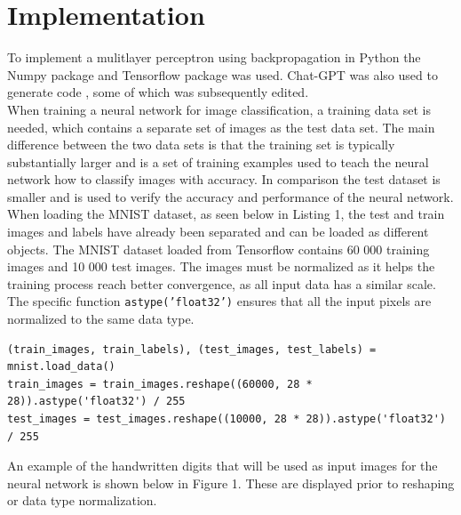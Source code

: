 \documentclass[twocolumn]{article}
\begin{document}
\section{Implementation}
To implement a mulitlayer perceptron using backpropagation in Python \cite{5python} the Numpy \cite{harris2020array} package and Tensorflow \cite{tensorflow2015-whitepaper} package was used. Chat-GPT was also used to generate code \cite{openai_gpt3}, some of which was subsequently edited.
\\\newline
When training a neural network for image classification, a training data set is needed, which contains a separate set of images as the test data set. The main difference between the two data sets is that the training set is typically substantially larger and is a set of training examples used to teach the neural network how to classify images with accuracy. \cite{grosse2} In comparison the test dataset is smaller and is used to verify the accuracy and performance of the neural network. When loading the MNIST dataset, as seen below in Listing 1, the test and train images and labels have already been separated and can be loaded as different objects. The MNIST dataset loaded from Tensorflow \cite{tensorflow2015-whitepaper} contains 60 000 training images and 10 000 test images. The images must be normalized as it helps the training process reach better convergence, as all input data has a similar scale. The specific function \texttt{astype('float32')} ensures that all the input pixels are normalized to the same data type.
\begin{lstlisting}[caption={Importing the MNIST dataset, and parsing the test and training images},captionpos=b]
(train_images, train_labels), (test_images, test_labels) = mnist.load_data()
train_images = train_images.reshape((60000, 28 * 28)).astype('float32') / 255
test_images = test_images.reshape((10000, 28 * 28)).astype('float32') / 255
\end{lstlisting}
An example of the handwritten digits that will be used as input images for the neural network is shown below in Figure 1. These are displayed prior to reshaping or data type normalization.
\\
\end{document}
